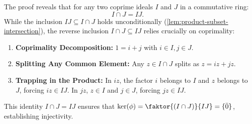 \begin{content}
\begin{steps}
The proof reveals that for any two coprime ideals $I$ and $J$ in a commutative ring:
\[
I \cap J = I J.
\]
While the inclusion $I J \subseteq I \cap J$ holds unconditionally (\cref{lem:product-subset-intersection}), the reverse inclusion $I \cap J \subseteq I J$ relies crucially on coprimality:
\begin{enumerate}[label=\textbf{(\arabic*)}]
    \setcounter{enumi}{0} \item \textbf{Coprimality Decomposition:} $1 = i + j$ with $i \in I, j \in J$.
    \setcounter{enumi}{1} \item \textbf{Splitting Any Common Element:} Any $z \in I \cap J$ splits as $z = i z + j z$.
    \item \textbf{Trapping in the Product:} In $i z$, the factor $i$ belongs to $I$ and $z$ belongs to $J$, forcing $i z \in I J$. In $j z$, $z \in I$ and $j \in J$, forcing $j z \in I J$.
\end{enumerate}
This identity $I \cap J = I J$ ensures that $\ker(\phi) = \faktor{(I \cap J)}{IJ} = \{ \bar{0} \}$, establishing injectivity.
\end{steps}
\end{content}

